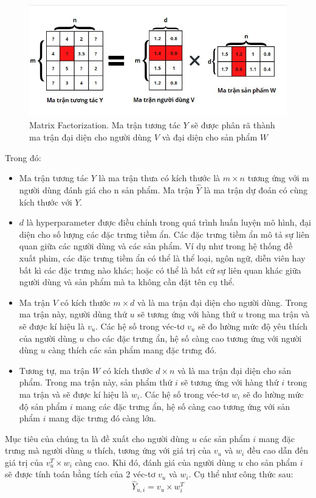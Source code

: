 \begin{figure}[h]
    \centering
    \includegraphics[width = \textwidth]{images/Chapter2/MF1.jpg}
    \caption{Matrix Factorization. Ma trận tương tác $Y$ sẽ được phân rã thành ma trận đại diện cho người dùng $V$ và đại diện cho sản phẩm $W$}
    \label{fig:chap2_MF1}
\end{figure}
Trong đó:
\begin{itemize}
    \item Ma trận tương tác $Y$ là ma trận thưa có kích thước là $m \times n$ tương ứng với m người dùng đánh giá cho n sản phẩm. Ma trận $\hat{Y}$ là ma trận dự đoán có cùng kích thước với $Y$.
    \item $d$ là hyperparameter được điều chỉnh trong quá trình huấn luyện mô hình, đại diện cho số lượng các đặc trưng tiềm ẩn. Các đặc trưng tiềm ẩn mô tả sự liên quan giữa các người dùng và các sản phẩm. Ví dụ như trong hệ thống đề xuất phim, các đặc trưng tiềm ẩn có thể là thể loại, ngôn ngữ, diễn viên hay bất kì các đặc trưng nào khác; hoặc có thể là bất cứ sự liên quan khác giữa người dùng và sản phẩm mà ta không cần đặt tên cụ thể.
    \item Ma trận $V$ có kích thước $m \times d$ và là ma trận đại diện cho người dùng. Trong ma trận này, người dùng thứ $u$ sẽ tương ứng với hàng thứ $u$ trong ma trận và sẽ được kí hiệu là $v_u$. Các hệ số trong véc-tơ $v_u$ sẽ đo lường mức độ yêu thích của người dùng $u$ cho các đặc trưng ẩn, hệ số càng cao tương ứng với người dùng $u$ càng thích các sản phẩm mang đặc trưng đó.
 
    \item Tương tự, ma trận $W$ có kích thước $d \times n$ và là ma trận đại diện cho sản phẩm. Trong ma trận này, sản phẩm thứ $i$ sẽ tương ứng với hàng thứ $i$ trong ma trận và sẽ được kí hiệu là $w_i$. Các hệ số trong véc-tơ $w_i$ sẽ đo lường mức độ sản phẩm $i$ mang các đặc trưng ẩn, hệ số càng cao tương ứng với sản phẩm $i$ mang đặc trưng đó càng lớn.
\end{itemize}
Mục tiêu của chúng ta là đề xuất cho người dùng $u$ các sản phẩm $i$ mang đặc trưng mà người dùng $u$ thích, tương ứng với giá trị của $v_u$ và $w_i$ đều cao dẫn đến giá trị của $v_u^T\times w_{i}$ càng cao. Khi đó, đánh giá của người dùng $u$ cho sản phẩm $i$ sẽ được tính toán bằng tích của 2 véc-tơ $v_u$ và $w_i$. Cụ thể như công thức sau:
\begin{equation}
\label{eq:2.1_yui_nonbias}
    \hat{Y}_{u,i} = v_{u} \times w_i^T
\end{equation}

